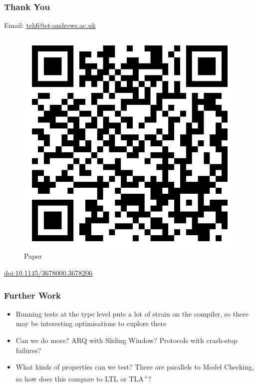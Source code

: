 \documentclass[compress]{beamer}
\begin{document}
\begin{frame}
  \frametitle{Thank You}

  \begin{center}
    {\large Email: {\href{mailto:teh6@st-andrews.ac.uk}{teh6@st-andrews.ac.uk}}}

    \begin{figure}
      \caption{\large Paper}
      \vspace*{-3mm}
      \includegraphics[width=0.4\framewidth]{acm-qr.png}
    \end{figure}
    \vspace*{-5mm}
    \href{https://doi.org/10.1145/3678000.3678206}{doi:10.1145/3678000.3678206}
    \vspace*{-6mm}
  \end{center}
\end{frame}


\begin{frame}
  \frametitle{Further Work}

  \large

  \begin{itemize}
    \item Running tests at the type level puts a lot of strain on the
          compiler, so there may be interesting optimisations to explore there
    \item Can we do more? ARQ with Sliding Window? Protocols with crash-stop
          failures?
    \item What kinds of properties can we test? There are parallels to Model
          Checking, so how does this compare to LTL or TLA\textsuperscript{+}?
  \end{itemize}

\end{frame}
\end{document}
